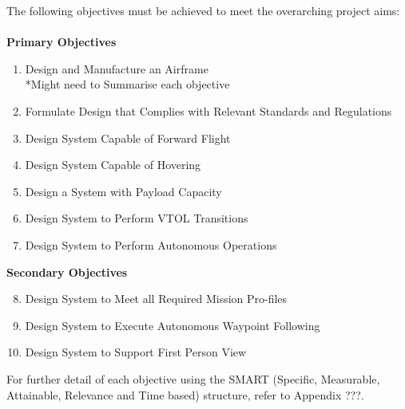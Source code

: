 The following objectives must be achieved to meet the overarching project aims:\\
\\
\textbf{Primary Objectives}
\begin{enumerate}
    \item Design and Manufacture an Airframe\\
    *Might need to Summarise each objective
    \item Formulate Design that Complies with Relevant Standards and Regulations
    \item Design System Capable of Forward Flight
    \item Design System Capable of Hovering
    \item Design a System with Payload Capacity
    \item Design System to Perform VTOL Transitions
    \item Design System to Perform Autonomous Operations
    \end{enumerate}
\textbf{Secondary Objectives}
\begin{enumerate}
    \setcounter{enumi}{7}
        \item Design System to Meet all Required Mission Pro-files
        \item Design System to Execute Autonomous Waypoint Following
        \item Design System to Support First Person View
    \end{enumerate}

For further detail of each objective using the SMART (Specific, Measurable, Attainable, Relevance and Time based) structure, refer to Appendix ???. 


